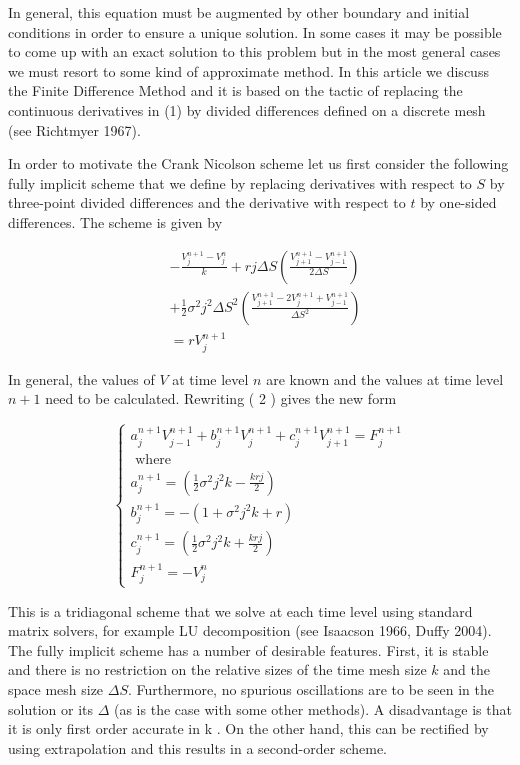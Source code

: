 \documentclass[10pt]{article}
\begin{document}
In general, this equation must be augmented by other boundary and initial conditions in order to ensure a unique solution. In some cases it may be possible to come up with an exact solution to this problem but in the most general cases we must resort to some kind of approximate method. In this article we discuss the Finite Difference Method and it is based on the tactic of replacing the continuous derivatives in (1) by divided differences defined on a discrete mesh (see Richtmyer 1967).

In order to motivate the Crank Nicolson scheme let us first consider the following fully implicit scheme that we define by replacing derivatives with respect to $S$ by three-point divided differences and the derivative with respect to $t$ by one-sided differences. The scheme is given by


\begin{align*}
& -\frac{V_{j}^{n+1}-V_{j}^{n}}{k}+r j \Delta S\left(\frac{V_{j+1}^{n+1}-V_{j-1}^{n+1}}{2 \Delta S}\right) \\
& +\frac{1}{2} \sigma^{2} j^{2} \Delta S^{2}\left(\frac{V_{j+1}^{n+1}-2 V_{j}^{n+1}+V_{j-1}^{n+1}}{\Delta S^{2}}\right)  \tag{2}\\
& =r V_{j}^{n+1}
\end{align*}


In general, the values of $V$ at time level $n$ are known and the values at time level $n+1$ need to be calculated. Rewriting ( 2 ) gives the new form

\[
\left\{\begin{array}{l}
a_{j}^{n+1} V_{j-1}^{n+1}+b_{j}^{n+1} V_{j}^{n+1}+c_{j}^{n+1} V_{j+1}^{n+1}=F_{j}^{n+1}  \tag{3}\\
\text { where } \\
a_{j}^{n+1}=\left(\frac{1}{2} \sigma^{2} j^{2} k-\frac{k r j}{2}\right) \\
b_{j}^{n+1}=-\left(1+\sigma^{2} j^{2} k+r\right) \\
c_{j}^{n+1}=\left(\frac{1}{2} \sigma^{2} j^{2} k+\frac{k r j}{2}\right) \\
F_{j}^{n+1}=-V_{j}^{n}
\end{array}\right.
\]

This is a tridiagonal scheme that we solve at each time level using standard matrix solvers, for example LU decomposition (see Isaacson 1966, Duffy 2004). The fully implicit scheme has a number of desirable features. First, it is stable and there is no restriction on the relative sizes of the time mesh size $k$ and the space mesh size $\Delta S$. Furthermore, no spurious oscillations are to be seen in the solution or its $\Delta$ (as is the case with some other methods). A disadvantage is that it is only first order accurate in k . On the other hand, this can be rectified by using extrapolation and this results in a second-order scheme.
\end{document}

